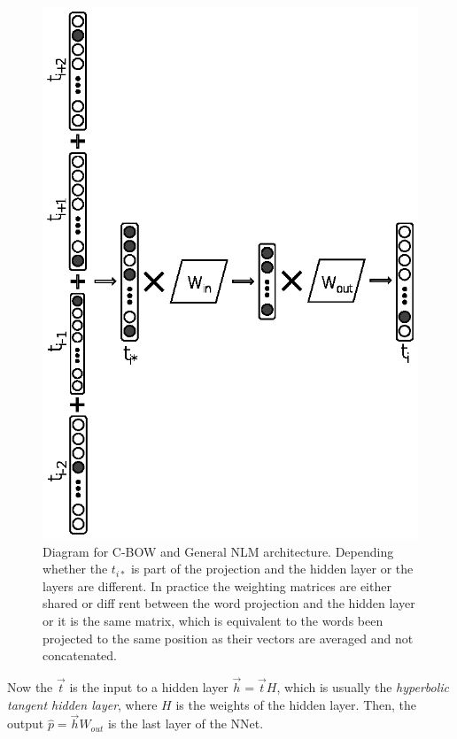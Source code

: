 \begin{figure}[t]
	\begin{center}
    	\includegraphics[scale=0.99]{Figures/CBOW_diagram.eps}
		\caption{Diagram for C-BOW and General NLM architecture. Depending whether the $t_{i*}$ is part of the projection and the hidden layer or the layers are different. In practice the weighting matrices are either shared or diff rent between the word projection and the hidden layer or it is the same matrix, which is equivalent to the words been projected to the same position as their vectors are averaged and not concatenated.}
		\label{chap:word_embeddings:fig:CBOW_diagram}
	\end{center}
\end{figure}

Now the $\vec{t}$ is the input to a hidden layer $\vec{h}=\vec{t}H$, which is usually the \textit{hyperbolic tangent hidden layer}, where $H$ is the weights of the hidden layer. Then, the output $\hat{p}=\vec{h}W_{out}$ is the last layer of the NNet.

